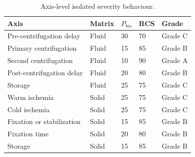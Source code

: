 \documentclass[preprint,12pt]{elsarticle}
\begin{document}
\begin{table}[!htbp]
\caption{Axis-level isolated severity behaviour.}
\label{tab:axis_level_influence}
\centering
\footnotesize
\setlength{\tabcolsep}{4pt}
\renewcommand{\arraystretch}{1.08}

\begin{tabular}{@{}L{4.0cm}C{1.8cm}C{1.8cm}C{1.8cm}C{2.0cm}@{}}
\toprule
\textbf{Axis}
& \textbf{Matrix}
& \textbf{\(P_{bio}\)}
& \textbf{RCS}
& \textbf{Grade} \\
\midrule

Pre-centrifugation delay
& Fluid
& 30
& 70
& Grade C \\

Primary centrifugation
& Fluid
& 15
& 85
& Grade B \\

Second centrifugation
& Fluid
& 10
& 90
& Grade A \\

Post-centrifugation delay
& Fluid
& 20
& 80
& Grade B \\

Storage
& Fluid
& 25
& 75
& Grade C \\

Warm ischemia
& Solid
& 25
& 75
& Grade C \\

Cold ischemia
& Solid
& 25
& 75
& Grade C \\

Fixation or stabilization
& Solid
& 15
& 85
& Grade B \\

Fixation time
& Solid
& 20
& 80
& Grade B \\

Storage
& Solid
& 15
& 85
& Grade B \\

\bottomrule
\end{tabular}
\end{table}
\end{document}
